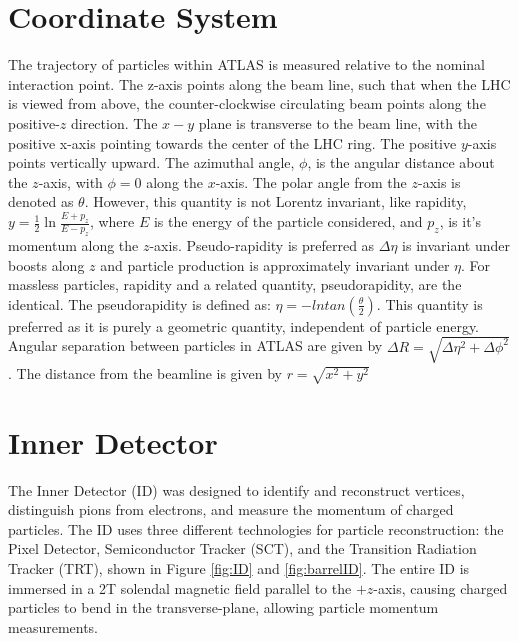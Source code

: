 \section{Coordinate System}
The trajectory of particles within ATLAS is measured relative to the nominal interaction point. The z-axis points along the beam line, such that when the LHC is viewed from above, the counter-clockwise circulating beam points along the positive-$z$ direction. The $x-y$ plane is transverse to the beam line, with the positive x-axis pointing towards the center of the LHC ring. The positive $y$-axis points vertically upward. The azimuthal angle, $\phi$, is the angular distance about the $z$-axis, with $\phi=0$ along the $x$-axis. The polar angle from the $z$-axis is denoted as $\theta$.  However, this quantity is not Lorentz invariant, like rapidity, $y=\frac{1}{2}\ln\frac{E+p_{z}}{E-p_{z}}$, where $E$ is the energy of the particle considered, and $p_{z}$, is it's momentum along the $z$-axis. Pseudo-rapidity is preferred as $\Delta \eta$ is invariant under boosts along $z$ and particle production is approximately invariant under $\eta$. For massless particles, rapidity and a related quantity, pseudorapidity, are the identical. The pseudorapidity is defined as: $\eta = -ln tan(\frac{\theta}{2})$.  This quantity is preferred as it is purely a geometric quantity, independent of particle energy. Angular separation between particles in ATLAS are given by $\Delta R = \sqrt{\Delta \eta^{2}+\Delta \phi^{2}}$. The distance from the beamline is given by $r=\sqrt{x^{2}+y^{2}}$
 
\section{Inner Detector}
The Inner Detector (ID) was designed to identify and reconstruct vertices, distinguish pions from electrons, and measure the momentum of charged particles. The ID uses three different technologies for particle reconstruction: the Pixel Detector, Semiconductor Tracker (SCT), and the Transition Radiation Tracker (TRT), shown in Figure \ref{fig:ID} and \ref{fig:barrelID}. The entire ID is immersed in a 2T solendal magnetic field parallel to the $+z$-axis, causing charged particles to bend in the transverse-plane, allowing particle momentum measurements. 

